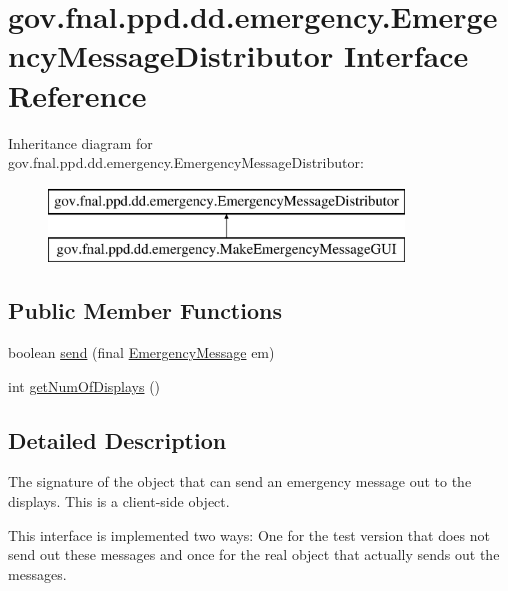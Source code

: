 \hypertarget{interfacegov_1_1fnal_1_1ppd_1_1dd_1_1emergency_1_1EmergencyMessageDistributor}{\section{gov.\-fnal.\-ppd.\-dd.\-emergency.\-Emergency\-Message\-Distributor Interface Reference}
\label{interfacegov_1_1fnal_1_1ppd_1_1dd_1_1emergency_1_1EmergencyMessageDistributor}
}
Inheritance diagram for gov.\-fnal.\-ppd.\-dd.\-emergency.\-Emergency\-Message\-Distributor\-:\begin{figure}[H]
\begin{center}
\leavevmode
\includegraphics[height=2.000000cm]{interfacegov_1_1fnal_1_1ppd_1_1dd_1_1emergency_1_1EmergencyMessageDistributor}
\end{center}
\end{figure}
\subsection*{Public Member Functions}
\begin{DoxyCompactItemize}
\item 
boolean \hyperlink{interfacegov_1_1fnal_1_1ppd_1_1dd_1_1emergency_1_1EmergencyMessageDistributor_aa67e1816eaa0182a8329bce2c1cd6a7a}{send} (final \hyperlink{classgov_1_1fnal_1_1ppd_1_1dd_1_1emergency_1_1EmergencyMessage}{Emergency\-Message} em)
\item 
int \hyperlink{interfacegov_1_1fnal_1_1ppd_1_1dd_1_1emergency_1_1EmergencyMessageDistributor_ae944177d6e61dbea576b27ce2b76f1d9}{get\-Num\-Of\-Displays} ()
\end{DoxyCompactItemize}


\subsection{Detailed Description}
The signature of the object that can send an emergency message out to the displays. This is a client-\/side object.

This interface is implemented two ways\-: One for the test version that does not send out these messages and once for the real object that actually sends out the messages.

